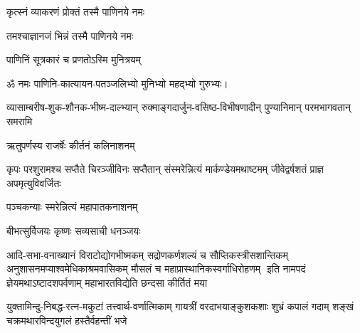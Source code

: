 \begin{center}

{कृत्स्नं व्याकरणं प्रोक्तं तस्मै पाणिनये नमः}

{तमश्चाज्ञानजं भिन्नं तस्मै पाणिनये नमः}

{पाणिनिं सूत्रकारं च प्रणतोऽस्मि मुनित्रयम्}

ॐ नमः पाणिनि-कात्यायन-पतञ्जलिभ्यो मुनिभ्यो महद्भ्यो गुरुभ्यः। 




{व्यासाम्बरीष-शुक-शौनक-भीष्म-दाल्भ्यान्}
{रुक्माङ्गदार्जुन-वसिष्ठ-विभीषणादीन्}
{पुण्यानिमान् परमभागवतान् समरामि}


{ऋतुपर्णस्य राजर्षेः कीर्तनं कलिनाशनम्}

{कृपः परशुरामश्च सप्तैते चिरञ्जीविनः}
{सप्तैतान् संस्मरेन्नित्यं मार्कण्डेयमथाष्टमम्}
{जीवेद्वर्षशतं प्राज्ञ अपमृत्युविवर्जितः}

{पञ्चकन्याः स्मरेन्नित्यं महापातकनाशनम्}


{बीभत्सुर्विजयः कृष्णः सव्यसाची धनञ्जयः}


\twolineshloka
{आदि-सभा-वनाख्यानं विराटोद्योगभीष्मकम्‌}
{सद्रोणकर्णशल्यं च सौप्तिकस्त्रीसशान्तिकम्‌}
‌
\twolineshloka
{अनुशासनमप्याश्वमेधिकाश्रमवासिकम्‌}
{मौसलं च महाप्रास्थानिकस्वर्गाधिरोहणम्‌}
‌
\twolineshloka
{इति नामपदं ज्ञेयमथाऽष्टादशपर्वणाम्‌}
{महाभारतविद्येति छन्दसा कीर्तितं मया}



{युक्तामिन्दु-निबद्ध-रत्न-मकुटां तत्त्वार्थ-वर्णात्मिकाम्}
{गायत्रीं वरदाभयाङ्कुशकशाः शुभ्रं कपालं गदाम्}
{शङ्खं चक्रमथारविन्दयुगलं हस्तैर्वहन्तीं भजे}








\end{center}
